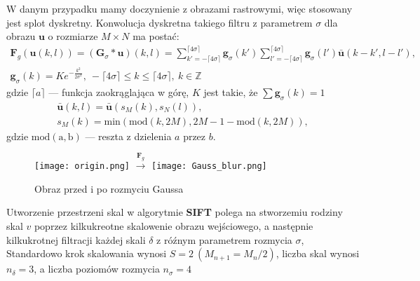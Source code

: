    W danym przypadku mamy doczynienie z obrazami rastrowymi, więc stosowany jest splot dyskretny. Konwolucja dyskretna takiego filtru z parametrem $\sigma$ dla obrazu $\mathbf{u}$ o rozmiarze $ M \times N $ ma postać:
   \begin{equation} \label{eq:gauss_d}
      \begin{split}
         \mathbf{F}_{g}(\mathbf{u}(k,l) )
         = (\mathbf{G}_{\sigma} * \mathbf{u}) (k,l) =
         \sum_{k' = -\lceil 4\sigma \rceil}^{\lceil 4\sigma \rceil} \mathbf{g}_{\sigma} (k')
         \sum_{l' = -\lceil 4\sigma \rceil}^{\lceil 4\sigma \rceil} \mathbf{g}_{\sigma} (l') \mathbf{\bar{u}} (k - k', l - l'),
         \\
         \mathbf{g}_{\sigma}(k) = Ke^{- \frac{k^2}{2 \sigma^2}}, \:
         -\lceil 4\sigma \rceil \leq k \leq \lceil 4\sigma \rceil, \:
         k \in \mathbb{Z}
      \end{split}
   \end{equation}
   gdzie $\lceil a \rceil$ --- funkcja zaokrąglająca w górę, $K$ jest takie, że $\sum \mathbf{g}_{\sigma} (k) = 1 $
   \begin{equation}
      \begin{split}
         \mathbf{\bar{u}}(k, l) =  \mathbf{\bar{u}} (s_M(k), s_N(l)),
         \\
         s_M(k) = \mathrm{min}(\mathrm{mod}(k, 2M), 2M - 1 - \mathrm{mod}(k, 2M)),
      \end{split}
   \end{equation}
   gdzie $ \mathrm{mod(a,b)} $ --- reszta z dzielenia $a$ przez $b$.

   \begin{figure}[h]
      \centering
      \texttt{[image: origin.png]}
      \Large{$ \xrightarrow{\mathbf{F}_{g}} $}
      \texttt{[image: Gauss\_blur.png]}
      \caption{Obraz przed i po rozmyciu Gaussa}
      \label {fig:gauss_blur}
   \end{figure}

   Utworzenie przestrzeni skal w algorytmie \textbf{SIFT} polega na stworzemiu rodziny skal $v$ poprzez kilkukreotne skalowenie obrazu wejściowego, a następnie kilkukrotnej filtracji każdej skali $\delta$ z róźnym parametrem rozmycia $\sigma$,
   Standardowo krok skalowania wynosi $ S = 2 \: (M_{n+1} = M_{n} / 2)$, liczba skal wynosi $ n_{\delta} = 3$, a liczba poziomów rozmycia $ n_{\sigma} = 4$


